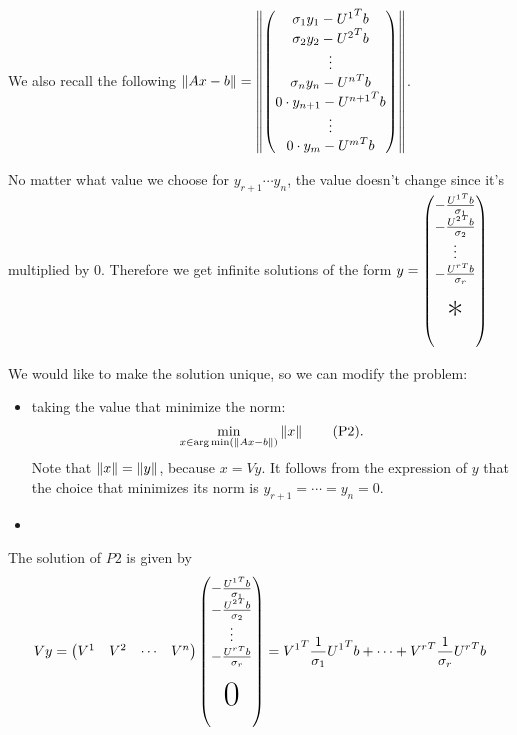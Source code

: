 \documentclass[ComputationalMathematics.tex]{subfiles}
\begin{document}
We also recall the following 
$\left\lVert Ax-b\right\rVert = \left\lVert
      \begin{pmatrix}
        \sigma_1 y_1 - {U^1}^{T}b\\
        \sigma_2 y_2 -{U^2}^{T}b\\
        \vdots\\
        \sigma_n y_n -{U^n}^{T}b\\
        0 \cdot y_{n+1} - {U^{n+1}}^{T}b\\
        \vdots\\
        0 \cdot y_m -{U^m}^{T}b\\
      \end{pmatrix}
    \right\rVert$.
    
No matter what value we choose for $y_{r+1} \cdots y_{n}$, the value doesn't change since it's multiplied by $0$.
 Therefore we get infinite solutions of the form $ y =
 \begin{pmatrix}
   -\frac{\tr{U^1} b}{\sigma_1}\\
    -\frac{\tr{U^2} b}{\sigma_2}\\
    \vdots\\
    -\frac{\tr{U^r} b}{\sigma_r}\\
    \\
    \text{\Huge{*}}\\
    \\
  \end{pmatrix}$

We would like to make the solution unique, so we can modify the problem:
  \begin{itemize}
    \item taking the value that minimize the norm:
    \begin{equation}
    	\min\limits_{x \in \arg\min(\left\lVert Ax-b\right\rVert)} \left\lVert x\right\rVert \tag{P2}.
    \end{equation}
Note that $\left\lVert x\right\rVert = \left\lVert y\right\rVert$, because $x = Vy$. It follows from the expression of $y$ that  the choice that minimizes its norm is $y_{r+1} = \cdots = y_{n} =0$.
    \item 
  \end{itemize}

  The solution of $P2$ is given by
  \[
    Vy = \begin{pmatrix} V^1 & V^2 & \cdots & V^{n} \end{pmatrix} \begin{pmatrix}
   -\frac{\tr{U^1} b}{\sigma_1}\\
    -\frac{\tr{U^2} b}{\sigma_2}\\
    \vdots\\
    -\frac{\tr{U^r} b}{\sigma_r}\\
    \\
    \text{\Huge{0}}\\
    \\
  \end{pmatrix}
  = \tr{V^1} \frac{1}{\sigma_1} \tr{U^1} b + \cdots + \tr{V^r} \frac{1}{\sigma_r} \tr{U^r} b
\]
\end{document}
